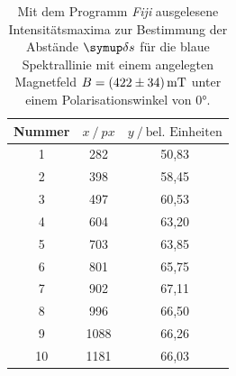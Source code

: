 \begin{table}[H]
  \centering
  \caption{Mit dem Programm \textit{Fiji} \cite{Fiji} ausgelesene Intensitätsmaxima zur Bestimmung der Abstände $\deltaup s$ für die blaue Spektrallinie mit einem angelegten Magnetfeld $B=\SI{422\pm34}{\milli\tesla}$  unter einem Polarisationswinkel von $0°$.}
  \label{tab:sigmablau422mT}
  \begin{tabular}{c|cc}
    \toprule
    {Nummer} & {$x \:/\: \si{px}$} & {$y \:/\: \text{bel. Einheiten}$}\\
    \midrule
 1 &  282  &	 50,83 \\
 2 &  398  &	 58,45 \\
 3 &  497  &	 60,53 \\
 4 &  604  &	 63,20 \\
 5 &  703  &	 63,85 \\
 6 &  801  &	 65,75 \\
 7 &  902  &	 67,11 \\
 8 &  996  &	 66,50 \\
 9 &  1088 &   66,26 \\
10 &  1181 &	 66,03 \\
  \end{tabular}
\end{table}

